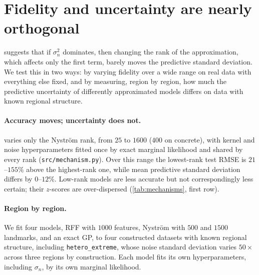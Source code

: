 \documentclass[11pt]{article}
\begin{document}
\section{Fidelity and uncertainty are nearly orthogonal}
\label{sec:orth}

 suggests that if $\sigma_n^2$ dominates, then changing the rank of the
approximation, which affects only the first term, barely moves the predictive
standard deviation. We test this in two ways: by varying fidelity over a wide range on
real data with everything else fixed, and by measuring, region by region, how much the
predictive uncertainty of differently approximated models differs on data with known
regional structure.

\paragraph{Accuracy moves; uncertainty does not.}  varies only the
Nystr\"om rank, from $25$ to $1600$ ($400$ on concrete), with kernel and noise
hyperparameters fitted once by exact marginal likelihood and shared by every rank
(\texttt{src/mechanism.py}). Over this range the lowest-rank test RMSE is
$21$--$155\%$ above the highest-rank one, while mean predictive standard deviation
differs by $0$--$12\%$. Low-rank models are less accurate but not correspondingly less
certain; their $z$-scores are over-dispersed (\cref{tab:mechanisms}, first row).

\begin{table}[h]\centering
\caption{Nystr\"om rank varied with hyperparameters held fixed, five seeds. Changes are
relative to the highest rank. Generated from \texttt{results/mechanism/rank\_sweep.json}.}
\label{tab:ranksweep}
\small

\end{table}

\paragraph{Region by region.} We fit four models, RFF with $1000$ features, Nystr\"om
with $500$ and $1500$ landmarks, and an exact GP, to four constructed datasets with
known regional structure, including \texttt{hetero\_extreme}, whose noise standard
deviation varies $50\times$ across three regions by construction. Each model fits its
own hyperparameters, including $\sigma_n$, by its own marginal likelihood.
\end{document}
